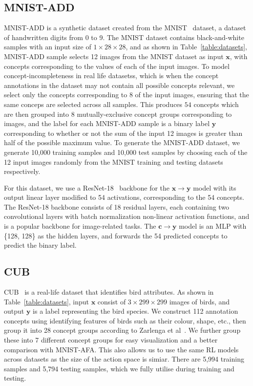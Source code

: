 \subsection{MNIST-ADD}
MNIST-ADD is a synthetic dataset created from 
the MNIST~\cite{mnist} dataset, a dataset of handwritten digits from 0 to 9.
The MNIST dataset contains black-and-white samples with an input size 
of $1 \times 28 \times 28$, and as shown in Table~\ref{table:datasets}, 
MNIST-ADD sample 
selects 12 images from the MNIST dataset as input $\mathbf{x}$,
with concepts corresponding to the values of each of the input images.
To model concept-incompleteness in real life datasetss,
which is when the 
concept annotations in the dataset may not contain all
possible concepts relevant, we select only the concepts corresponding to 8
of the input images, ensuring that the same conceps are selected across
all samples. This produces $54$ concepts which are then grouped into 8 
mutually-exclusive concept groups corresponding to images, 
and the label for each MNIST-ADD sample
is a binary label $\mathbf{y}$ corresponding to whether or not the sum of the input
12 images is greater than half of the possible maximum value.
 To generate the MNIST-ADD dataset,
we generate 10,000 training samples and 10,000 test samples by choosing
each of the 12 input images randomly from the MNIST training and testing
datasets respectively.

For this dataset, we use a ResNet-18~\cite{resnet} backbone for the $\mathbf{x} \to \mathbf{y}$
model with its output linear layer modified to 54 activations, corresponding
to the 54 concepts. The ResNet-18 backbone consists of 18 residual layers,
each containing two convolutional layers with batch normalization non-linear
activation functions, and is a popular backbone for image-related tasks.
The $\mathbf{c} \to \mathbf{y}$ model is an MLP with \{128, 128\} as the hidden
layers, and forwards the 54 predicted concepts to predict the binary label.

\subsection{CUB}

CUB~\cite{cub} is a real-life dataset that identifies bird attributes.
As shown in Table~\ref{table:datasets}, 
input $\mathbf{x}$ consist of $3 \times 299 \times 299$ images of 
 birds, and output $\mathbf{y}$ is a label representing the bird species.
We construct
112 annotation concepts 
using identifying features of birds such as their colour, shape, etc.,
then group it into 28 concept groups according
to Zarlenga et al~\cite{intcem}. We further group these
into 7 different concept groups for easy visualization and a better comparison
with MNIST-AFA. This also allows us to use the same RL models across datasets
as the size of the action space is simiar. There are 
5,994 training samples and 5,794 testing samples, which we fully
utilise during training and testing.

